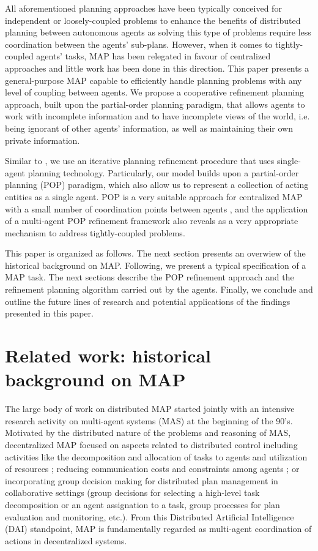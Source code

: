 \documentclass[12pt]{article}
\begin{document}
All aforementioned planning approaches have been typically conceived for independent or loosely-coupled problems to enhance the benefits of distributed planning between autonomous agents as solving this type of problems require less coordination between the agents' sub-plans. However, when it comes to tightly-coupled agents' tasks, MAP has been relegated in favour of centralized approaches and little work has been done in this direction. This paper presents a general-purpose MAP capable to efficiently handle planning problems with any level of coupling between agents. We propose a cooperative refinement planning approach, built upon the partial-order planning paradigm, that allows agents to work with incomplete information and to have incomplete views of the world, i.e. being ignorant of other agents' information, as well as maintaining their own private information.

Similar to \cite{Jonsson2011ScalingUM}, we use an iterative planning refinement procedure that uses single-agent planning technology. Particularly, our model builds upon a partial-order planning (POP) paradigm, which also allow us to represent a collection of acting entities as a single agent. POP is a very suitable approach for centralized MAP with a small number of coordination points between agents \cite{Kvarnstrm2010PlanningFL}, and the application of a multi-agent POP refinement framework also reveals as a very appropriate mechanism to address tightly-coupled problems.

This paper is organized as follows. The next section presents an overwiew of the historical background on MAP. Following, we present a typical specification of a MAP task. The next sections describe the POP refinement approach and the refinement planning algorithm carried out by the agents. Finally, we conclude and outline the future lines of research and potential applications of the findings presented in this paper.

\section{Related work: historical background on MAP}

The large body of work on distributed MAP started jointly with an intensive research activity on multi-agent systems (MAS) at the beginning of the 90’s. Motivated by the distributed nature of the problems and reasoning of MAS, decentralized MAP focused on aspects related to distributed control including activities like the decomposition and allocation of tasks to agents and utilization of resources \cite{120067}\cite{10.5555/3090522.3090546}; reducing communication costs and constraints among agents \cite{decker_lesser_1992}\cite{Wolverton1998ControllingCI}; or incorporating group decision making for distributed plan management in collaborative settings (group decisions for selecting a high-level task decomposition or an agent assignation to a task, group processes for plan evaluation and monitoring, etc.)\cite{Grosz1999PlanningAA}. From this Distributed Artificial Intelligence (DAI) standpoint, MAP is fundamentally regarded as multi-agent coordination of actions in decentralized systems.
\end{document}
